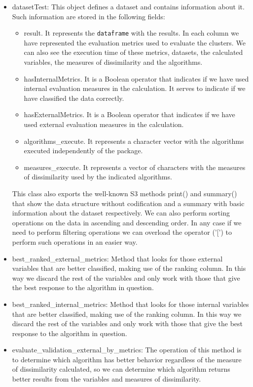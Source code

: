 \begin{itemize}
    \item datasetTest: This object defines a dataset and contains information about it. Such information
are stored in the following fields:
    \begin{itemize}
        \item result. It represents the \texttt{data\.frame} with the results. In each column we have represented the evaluation metrics used to evaluate the clusters. We can also see the execution time of these metrics, datasets, the calculated variables, the measures of dissimilarity and the algorithms.
        \item hasInternalMetrics. It is a Boolean operator that indicates if we have used internal evaluation measures in the calculation. It serves to indicate if we have classified the data correctly.
        \item hasExternalMetrics. It is a Boolean operator that indicates if we have used external evaluation measures in the calculation.
        \item algorithms\_execute. It represents a character vector with the algorithms executed independently of the package.
        \item measures\_execute. It represents a vector of characters with the measures of dissimilarity used by the indicated algorithms.
    \end{itemize}
    This class also exports the well-known S3 methods print() and summary() that show the data
structure without codification and a summary with basic information about the dataset respectively. We can also perform sorting operations on the data in ascending and descending order. In any case if we need to perform filtering operations we can overload the operator ('[') to perform such operations in an easier way.
    \item best\_ranked\_external\_metrics: Method that looks for those external variables that are better classified, making use of the ranking column. In this way we discard the rest of the variables and only work with those that give the best response to the algorithm in question.
    \item best\_ranked\_internal\_metrics: Method that looks for those internal variables that are better classified, making use of the ranking column. In this way we discard the rest of the variables and only work with those that give the best response to the algorithm in question.
    \item evaluate\_validation\_external\_by\_metrics: The operation of this method is to determine which algorithm has better behavior regardless of the measure of dissimilarity calculated, so we can determine which algorithm returns better results from the variables and measures of dissimilarity.

\end{itemize}
